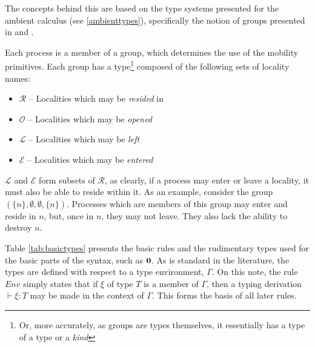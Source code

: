 The concepts behind this are based on the type systems presented for
the ambient calculus (see \ref{ambienttypes}), specifically the
notion of groups presented in \cite{ambienttypes} and \cite{m3}.

Each process is a member of a group, which determines the use of the
mobility primitives.  Each group has a type\footnote{Or, more
  accurately, as groups are types themselves, it essentially has a
  type of a type or a \emph{kind}} composed of the following sets of
locality names:

\begin{itemize}
\item $\mathscr{R}$ -- Localities which may be \emph{resided} in
\item $\mathscr{O}$ -- Localities which may be \emph{opened}
\item $\mathscr{L}$ -- Localities which may be \emph{left}
\item $\mathscr{E}$ -- Localities which may be \emph{entered}
\end{itemize}

$\mathscr{L}$ and $\mathscr{E}$ form subsets of $\mathscr{R}$, as
clearly, if a process may enter or leave a locality, it must also be
able to reside within it.  As an example, consider the group
$(\{n\},\emptyset, \emptyset,\{n\})$.  Processes which are members of
this group may enter and reside in $n$, but, once in $n$, they may not
leave.  They also lack the ability to destroy $n$.

Table \ref{tab:basictypes} presents the basic rules and the rudimentary
types used for the basic parts of the syntax, such as $\textbf{0}$.  As is
standard in the literature, the types are defined with respect to a type
environment, $\Gamma$.  On this note, the rule $Env$ simply states that
if $\xi$ of type $T$ is a member of $\Gamma$, then a typing derivation
$\vdash \xi : T$ may be made in the context of $\Gamma$.  This forms the
basis of all later rules.

